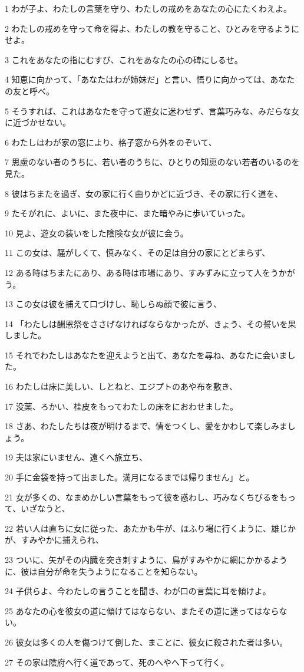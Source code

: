 \par 1 わが子よ、わたしの言葉を守り、わたしの戒めをあなたの心にたくわえよ。
\par 2 わたしの戒めを守って命を得よ、わたしの教を守ること、ひとみを守るようにせよ。
\par 3 これをあなたの指にむすび、これをあなたの心の碑にしるせ。
\par 4 知恵に向かって、「あなたはわが姉妹だ」と言い、悟りに向かっては、あなたの友と呼べ。
\par 5 そうすれば、これはあなたを守って遊女に迷わせず、言葉巧みな、みだらな女に近づかせない。
\par 6 わたしはわが家の窓により、格子窓から外をのぞいて、
\par 7 思慮のない者のうちに、若い者のうちに、ひとりの知恵のない若者のいるのを見た。
\par 8 彼はちまたを過ぎ、女の家に行く曲りかどに近づき、その家に行く道を、
\par 9 たそがれに、よいに、また夜中に、また暗やみに歩いていった。
\par 10 見よ、遊女の装いをした陰険な女が彼に会う。
\par 11 この女は、騒がしくて、慎みなく、その足は自分の家にとどまらず、
\par 12 ある時はちまたにあり、ある時は市場にあり、すみずみに立って人をうかがう。
\par 13 この女は彼を捕えて口づけし、恥しらぬ顔で彼に言う、
\par 14 「わたしは酬恩祭をささげなければならなかったが、きょう、その誓いを果しました。
\par 15 それでわたしはあなたを迎えようと出て、あなたを尋ね、あなたに会いました。
\par 16 わたしは床に美しい、しとねと、エジプトのあや布を敷き、
\par 17 没薬、ろかい、桂皮をもってわたしの床をにおわせました。
\par 18 さあ、わたしたちは夜が明けるまで、情をつくし、愛をかわして楽しみましょう。
\par 19 夫は家にいません、遠くへ旅立ち、
\par 20 手に金袋を持って出ました。満月になるまでは帰りません」と。
\par 21 女が多くの、なまめかしい言葉をもって彼を惑わし、巧みなくちびるをもって、いざなうと、
\par 22 若い人は直ちに女に従った、あたかも牛が、ほふり場に行くように、雄じかが、すみやかに捕えられ、
\par 23 ついに、矢がその内臓を突き刺すように、鳥がすみやかに網にかかるように、彼は自分が命を失うようになることを知らない。
\par 24 子供らよ、今わたしの言うことを聞き、わが口の言葉に耳を傾けよ。
\par 25 あなたの心を彼女の道に傾けてはならない、またその道に迷ってはならない。
\par 26 彼女は多くの人を傷つけて倒した、まことに、彼女に殺された者は多い。
\par 27 その家は陰府へ行く道であって、死のへやへ下って行く。

